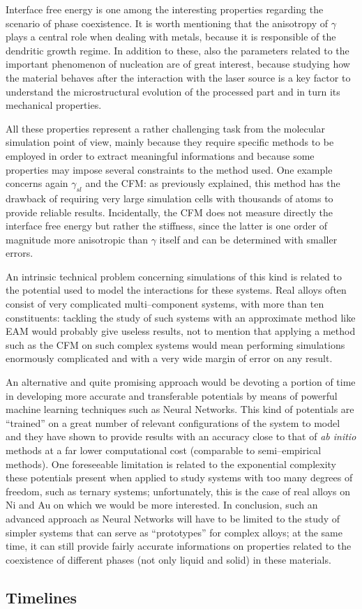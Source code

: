 Interface free energy is one among the interesting properties regarding the scenario of phase coexistence. It is worth mentioning that the anisotropy of $\gamma$ plays a central role when dealing with metals, because it is responsible of the dendritic growth regime. In addition to these, also the parameters related to the important phenomenon of nucleation are of great interest, because studying how the material behaves after the interaction with the laser source is a key factor to understand the microstructural evolution of the processed part and in turn its mechanical properties.


All these properties represent a rather challenging task from the molecular simulation point of view, mainly because they require specific methods to be employed in order to extract meaningful informations and because some properties may impose several constraints to the method used. One example concerns again $\gamma_{sl}$ and the CFM: as previously explained, this method has the drawback of requiring very large simulation cells with thousands of atoms to provide reliable results. Incidentally, the CFM does not measure directly the interface free energy but rather the stiffness, since the latter is one order of magnitude more anisotropic than $\gamma$ itself and can be determined with smaller errors.

An intrinsic technical problem concerning simulations of this kind is related to the potential used to model the interactions for these systems. Real alloys often consist of very complicated multi--component systems, with more than ten constituents: tackling the study of such systems with an approximate method like EAM would probably give useless results, not to mention that applying a method such as the CFM on such complex systems would mean performing simulations enormously complicated and with a very wide margin of error on any result.

An alternative and quite promising approach would be devoting a portion of time in developing more accurate and transferable potentials by means of powerful machine learning techniques such as Neural Networks. This kind of potentials are ``trained'' on a great number of relevant configurations of the system to model and they have shown to provide results with an accuracy close to that of \textit{ab initio} methods at a far lower computational cost (comparable to semi--empirical methods). One foreseeable limitation is related to the exponential complexity these potentials present when applied to study systems with too many degrees of freedom, such as ternary systems; unfortunately, this is the case of real alloys on Ni and Au on which we would be more interested. In conclusion, such an advanced approach as Neural Networks will have to be limited to the study of simpler systems that can serve as ``prototypes'' for complex alloys; at the same time, it can still provide fairly accurate informations on properties related to the coexistence of different phases (not only liquid and solid) in these materials.




\subsection{Timelines}
